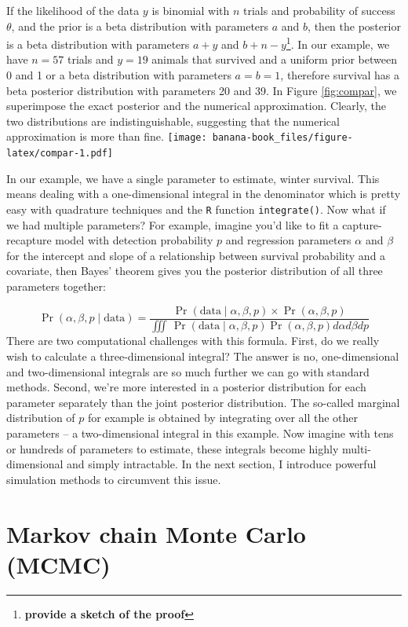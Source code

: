 \documentclass[
  12pt,
]{krantz}
\begin{document}
If the likelihood of the data \(y\) is binomial with \(n\) trials and probability of success \(\theta\), and the prior is a beta distribution with parameters \(a\) and \(b\), then the posterior is a beta distribution with parameters \(a + y\) and \(b + n - y\)\footnote{\textbf{provide a sketch of the proof}}. In our example, we have \(n = 57\) trials and \(y = 19\) animals that survived and a uniform prior between 0 and 1 or a beta distribution with parameters \(a = b = 1\), therefore survival has a beta posterior distribution with parameters 20 and 39. In Figure \ref{fig:compar}, we superimpose the exact posterior and the numerical approximation. Clearly, the two distributions are indistinguishable, suggesting that the numerical approximation is more than fine.
\texttt{[image: banana-book\_files/figure-latex/compar-1.pdf]}

In our example, we have a single parameter to estimate, winter survival. This means dealing with a one-dimensional integral in the denominator which is pretty easy with quadrature techniques and the \texttt{R} function \texttt{integrate()}. Now what if we had multiple parameters? For example, imagine you'd like to fit a capture-recapture model with detection probability \(p\) and regression parameters \(\alpha\) and \(\beta\) for the intercept and slope of a relationship between survival probability and a covariate, then Bayes' theorem gives you the posterior distribution of all three parameters together:

\[ \Pr(\alpha, \beta, p \mid \text{data}) = \frac{ \Pr(\text{data} \mid \alpha, \beta, p) \times \Pr(\alpha, \beta, p)}{\iiint \, \Pr(\text{data} \mid \alpha, \beta, p) \Pr(\alpha, \beta, p) d\alpha d\beta dp} \]
There are two computational challenges with this formula. First, do we really wish to calculate a three-dimensional integral? The answer is no, one-dimensional and two-dimensional integrals are so much further we can go with standard methods. Second, we're more interested in a posterior distribution for each parameter separately than the joint posterior distribution. The so-called marginal distribution of \(p\) for example is obtained by integrating over all the other parameters -- a two-dimensional integral in this example. Now imagine with tens or hundreds of parameters to estimate, these integrals become highly multi-dimensional and simply intractable. In the next section, I introduce powerful simulation methods to circumvent this issue.

\hypertarget{markov-chain-monte-carlo-mcmc}{%
\section{Markov chain Monte Carlo (MCMC)}\label{markov-chain-monte-carlo-mcmc}}
\end{document}
